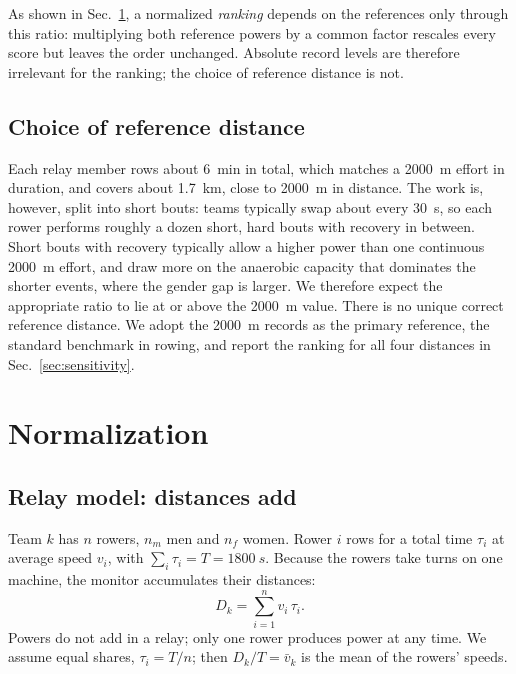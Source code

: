 \documentclass[twocolumn, 10pt]{article}
\begin{document}
As shown in Sec.~\ref{sec:normalization}, a normalized \emph{ranking}
depends on the references only through this ratio: multiplying both reference
powers by a common factor rescales every score but leaves the order unchanged.
Absolute record levels are therefore irrelevant for the ranking; the
choice of reference distance is not.

\subsection{Choice of reference distance}
\label{sec:refdistance}

Each relay member rows about \SI{6}{min} in total, which matches a
\SI{2000}{m} effort in duration, and covers about \SI{1.7}{km}, close to
\SI{2000}{m} in distance.
The work is, however, split into short bouts: teams typically swap about every
\SI{30}{s}, so each rower performs roughly a dozen short, hard bouts with
recovery in between.
Short bouts with recovery typically allow a higher power than one
continuous \SI{2000}{m} effort, and draw more on the anaerobic capacity that
dominates the shorter events, where the gender gap is larger.
We therefore expect the appropriate ratio to lie at or above the
\SI{2000}{m} value.
There is no unique correct reference distance.
We adopt the \SI{2000}{m} records as the primary reference, the standard
benchmark in rowing, and report the ranking for all four distances in
Sec.~\ref{sec:sensitivity}.

\section{Normalization}
\label{sec:normalization}

\subsection{Relay model: distances add}

Team $k$ has $n$ rowers, $n_m$ men and $n_f$ women.
Rower $i$ rows for a total time $\tau_i$ at average speed $v_i$, with
$\sum_i\tau_i=T=\SI{1800}{s}$.
Because the rowers take turns on one machine, the monitor accumulates their
distances:
\begin{equation}
  D_k = \sum_{i=1}^{n} v_i\,\tau_i .
  \label{eq:relay}
\end{equation}
Powers do not add in a relay; only one rower produces power at any time.
We assume equal shares, $\tau_i=T/n$;
then $D_k/T=\bar v_k$ is the mean of the rowers' speeds.
\end{document}
